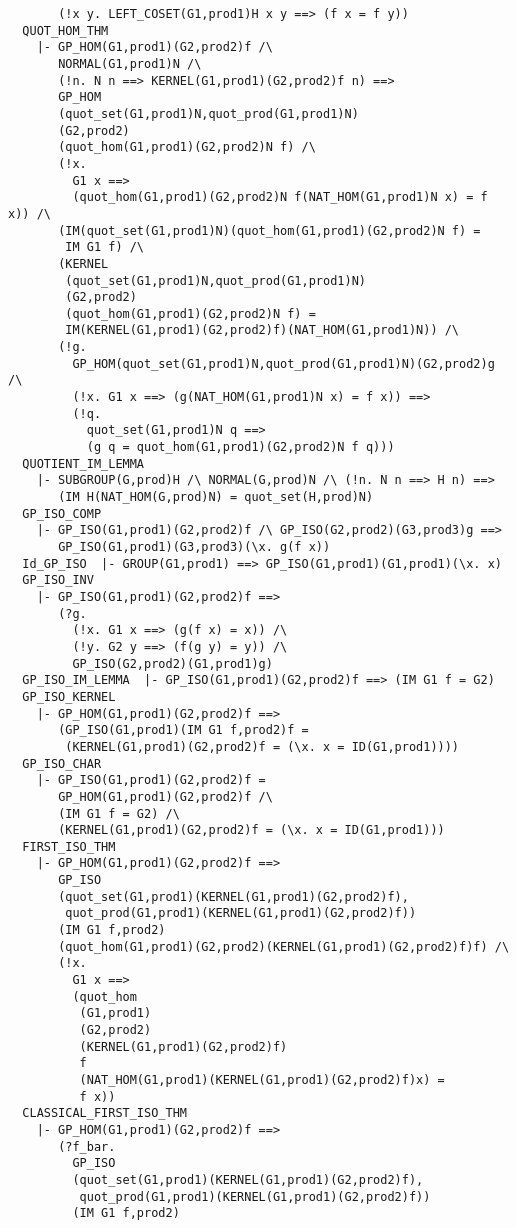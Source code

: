\begin{verbatim}
       (!x y. LEFT_COSET(G1,prod1)H x y ==> (f x = f y))
  QUOT_HOM_THM
    |- GP_HOM(G1,prod1)(G2,prod2)f /\
       NORMAL(G1,prod1)N /\
       (!n. N n ==> KERNEL(G1,prod1)(G2,prod2)f n) ==>
       GP_HOM
       (quot_set(G1,prod1)N,quot_prod(G1,prod1)N)
       (G2,prod2)
       (quot_hom(G1,prod1)(G2,prod2)N f) /\
       (!x.
         G1 x ==>
         (quot_hom(G1,prod1)(G2,prod2)N f(NAT_HOM(G1,prod1)N x) = f x)) /\
       (IM(quot_set(G1,prod1)N)(quot_hom(G1,prod1)(G2,prod2)N f) =
        IM G1 f) /\
       (KERNEL
        (quot_set(G1,prod1)N,quot_prod(G1,prod1)N)
        (G2,prod2)
        (quot_hom(G1,prod1)(G2,prod2)N f) =
        IM(KERNEL(G1,prod1)(G2,prod2)f)(NAT_HOM(G1,prod1)N)) /\
       (!g.
         GP_HOM(quot_set(G1,prod1)N,quot_prod(G1,prod1)N)(G2,prod2)g /\
         (!x. G1 x ==> (g(NAT_HOM(G1,prod1)N x) = f x)) ==>
         (!q.
           quot_set(G1,prod1)N q ==>
           (g q = quot_hom(G1,prod1)(G2,prod2)N f q)))
  QUOTIENT_IM_LEMMA
    |- SUBGROUP(G,prod)H /\ NORMAL(G,prod)N /\ (!n. N n ==> H n) ==>
       (IM H(NAT_HOM(G,prod)N) = quot_set(H,prod)N)
  GP_ISO_COMP
    |- GP_ISO(G1,prod1)(G2,prod2)f /\ GP_ISO(G2,prod2)(G3,prod3)g ==>
       GP_ISO(G1,prod1)(G3,prod3)(\x. g(f x))
  Id_GP_ISO  |- GROUP(G1,prod1) ==> GP_ISO(G1,prod1)(G1,prod1)(\x. x)
  GP_ISO_INV
    |- GP_ISO(G1,prod1)(G2,prod2)f ==>
       (?g.
         (!x. G1 x ==> (g(f x) = x)) /\
         (!y. G2 y ==> (f(g y) = y)) /\
         GP_ISO(G2,prod2)(G1,prod1)g)
  GP_ISO_IM_LEMMA  |- GP_ISO(G1,prod1)(G2,prod2)f ==> (IM G1 f = G2)
  GP_ISO_KERNEL
    |- GP_HOM(G1,prod1)(G2,prod2)f ==>
       (GP_ISO(G1,prod1)(IM G1 f,prod2)f =
        (KERNEL(G1,prod1)(G2,prod2)f = (\x. x = ID(G1,prod1))))
  GP_ISO_CHAR
    |- GP_ISO(G1,prod1)(G2,prod2)f =
       GP_HOM(G1,prod1)(G2,prod2)f /\
       (IM G1 f = G2) /\
       (KERNEL(G1,prod1)(G2,prod2)f = (\x. x = ID(G1,prod1)))
  FIRST_ISO_THM
    |- GP_HOM(G1,prod1)(G2,prod2)f ==>
       GP_ISO
       (quot_set(G1,prod1)(KERNEL(G1,prod1)(G2,prod2)f),
        quot_prod(G1,prod1)(KERNEL(G1,prod1)(G2,prod2)f))
       (IM G1 f,prod2)
       (quot_hom(G1,prod1)(G2,prod2)(KERNEL(G1,prod1)(G2,prod2)f)f) /\
       (!x.
         G1 x ==>
         (quot_hom
          (G1,prod1)
          (G2,prod2)
          (KERNEL(G1,prod1)(G2,prod2)f)
          f
          (NAT_HOM(G1,prod1)(KERNEL(G1,prod1)(G2,prod2)f)x) =
          f x))
  CLASSICAL_FIRST_ISO_THM
    |- GP_HOM(G1,prod1)(G2,prod2)f ==>
       (?f_bar.
         GP_ISO
         (quot_set(G1,prod1)(KERNEL(G1,prod1)(G2,prod2)f),
          quot_prod(G1,prod1)(KERNEL(G1,prod1)(G2,prod2)f))
         (IM G1 f,prod2)

\end{verbatim}
